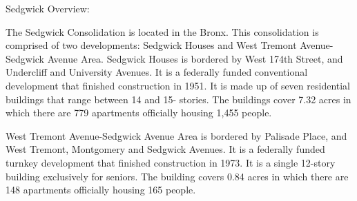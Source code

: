 Sedgwick Overview:  

The Sedgwick Consolidation is located in the Bronx. This consolidation is comprised of two developments: Sedgwick Houses and West Tremont Avenue-Sedgwick Avenue Area. Sedgwick Houses is bordered by West 174th Street, and Undercliff and University Avenues. It is a federally funded conventional development that finished construction in 1951. It is made up of seven residential buildings that range between 14 and 15- stories. The buildings cover 7.32 acres in which there are 779 apartments officially housing 1,455 people.   

  

West Tremont Avenue-Sedgwick Avenue Area is bordered by Palisade Place, and West Tremont, Montgomery and Sedgwick Avenues. It is a federally funded turnkey development that finished construction in 1973. It is a single 12-story building exclusively for seniors. The building covers 0.84 acres in which there are 148 apartments officially housing 165 people.   

 
